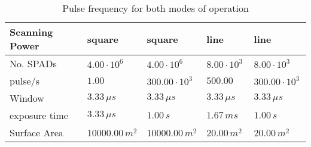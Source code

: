 \begin{table}[H]
\centering
\caption{Pulse frequency for both modes of operation}
\label{tab:scanning_power}
\begin{tabular}{|l|llll|}\hline
    \textbf{Scanning Power} & square & square & line & line \\
    \hline 
    No. SPADs & $4.00\cdot10^6\,$ & $4.00\cdot10^6\,$ & $8.00\cdot10^3\,$ & $8.00\cdot10^3\,$ \\
    pulse/s & $1.00\,\,$ & $300.00\cdot10^3\,$ & $500.00\,\,$ & $300.00\cdot10^3\,$ \\
    Window & $3.33\,\mu s$ & $3.33\,\mu s$ & $3.33\,\mu s$ & $3.33\,\mu s$ \\
    exposure time & $3.33\,\mu s$ & $1.00\, s$ & $1.67\,m s$ & $1.00\, s$ \\
    Surface Area & $10000.00\, m^2$ & $10000.00\, m^2$ & $20.00\, m^2$ & $20.00\, m^2$ \\
    \hline 
\end{tabular}
\end{table}
